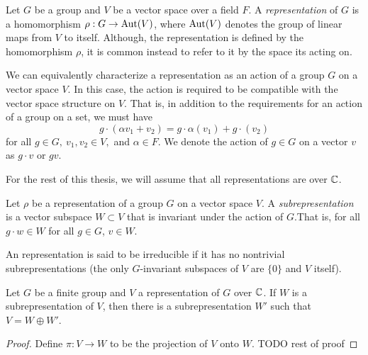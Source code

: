 \begin{definition}
    Let $G$ be a group and $V$ be a vector space over a field $F$. A \emph{representation} of $G$ is a homomorphism 
    $\rho : G \rightarrow \operatorname{Aut}(V)$, where $\operatorname{Aut}(V)$ denotes the group of linear maps from $V$ to itself. Although, 
    the representation is defined by the homomorphism $\rho$, it is common instead to refer to it by the space its 
    acting on.

    We can equivalently characterize a representation as an action of a group $G$ on a vector space $V$. In this 
    case, the action is required to be compatible with the vector space structure on $V$. That is, in addition to 
    the requirements for an action of a group on a set, we must have
\[g \cdot (\alpha v_1 + v_2) = g\cdot \alpha(v_1) + g\cdot(v_2)\]
    for all $g \in G,\ v_1, v_2 \in V,$ and $\alpha \in F$.
    We denote the action of $g \in G$ on a vector $v$ as $g \cdot v$ or $gv$.
\end{definition}

For the rest of this thesis, we will assume that all representations are over $\mathbb{C}$.

 
\begin{definition}
    Let $\rho$ be a representation of a group $G$ on a vector space $V$. A \emph{subrepresentation} is a vector 
    subspace $W \subset V$ that is invariant under the action of $G$.\footnotemark That is, for all $g\cdot w \in 
    W$ for all $g \in G$, $v \in W$.
    
    An representation is said to be irreducible if it has no nontrivial subrepresentations (the only $G$-invariant 
    subspaces of $V$ are $\{ 0 \}$ and $V$ itself).
\end{definition}



\begin{theorem}
    Let $G$ be a finite group and $V$ a representation of $G$ over $\mathbb{C}$. If $W$ is a subrepresentation of $V$, then 
there is a subrepresentation $W'$ such that $V = W \oplus W'$.  
\end{theorem}

\begin{proof}
    Define $\pi : V \rightarrow W$ to be the projection of $V$ onto $W$. TODO rest of proof
\end{proof}



